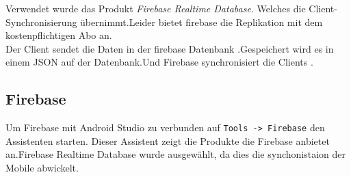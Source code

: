 Verwendet wurde das Produkt \textit{Firebase Realtime Database}. Welches die Client-Synchronisierung übernimmt.Leider bietet firebase die Replikation mit dem kostenpflichtigen Abo an.\\ Der Client sendet die Daten in der firebase Datenbank .Gespeichert wird es in einem JSON auf der Datenbank.Und Firebase synchronisiert  die Clients .


\subsection{Firebase}
Um Firebase mit Android Studio zu verbunden auf \verb|Tools -> Firebase| den Assistenten starten.
Dieser Assistent zeigt die Produkte die Firebase anbietet an.Firebase Realtime Database wurde ausgewählt, da dies die synchonistaion der Mobile abwickelt.



